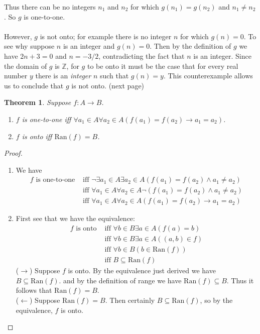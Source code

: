\documentclass{report}
\newtheorem*{theorem}{Theorem}
\theoremstyle{definition}
\begin{document}
Thus there can be no integers $n_1$ and $n_2$ for which $g(n_1)=g(n_2)$ and $n_1\neq n_2$. So $g$ is one-to-one.\\
\vspace{1mm}\\
However, $g$ is not onto; for example there is no integer $n$ for which $g(n)=0$. To
see why suppose $n$ is an integer and $g(n)=0$. Then by the definition of $g$ we have $2n+3=0$ and $n=-3/2$, contradicting the fact that $n$ is an integer. Since the domain of $g$ is $\mathbb Z$, 
for $g$ to be onto it must be the case that for every real number $y$ there is an \textit{integer} $n$ such that $g(n)=y$. This counterexample allows us to conclude that $g$ is not onto.
(next page)\newpage
\begin{theorem}
Suppose $f:A\to B$.
\begin{enumerate}
\item $f$ is one-to-one iff $\forall a_1\in A\forall a_2\in A(f(a_1)=f(a_2)\to a_1=a_2)$.
\item $f$ is onto iff $\text{Ran}(f)=B$.
\end{enumerate}
\end{theorem}
\begin{proof}\hspace{1mm}
\begin{enumerate}
\item We have
\begin{align*}
f\text{ is one-to-one}&\text{ iff }\neg\exists a_1\in A\exists a_2\in A(f(a_1)=f(a_2)\land a_1\neq a_2)\\
&\text{ iff }\forall a_1\in A\forall a_2\in A\neg(f(a_1)=f(a_2)\land a_1\neq a_2)\\
&\text{ iff }\forall a_1\in A\forall a_2\in A(f(a_1)=f(a_2)\to a_1=a_2)
\end{align*}
\item First see that we have the equivalence:
\begin{align*}
f\text{ is onto}&\text{ iff }\forall b\in B\exists a\in A(f(a)=b)\\
&\text{ iff }\forall b\in B\exists a\in A((a,b)\in f)\\
&\text{ iff }\forall b\in B (b\in\text{Ran}(f))\\
&\text{ iff }B\subseteq\text{Ran}(f)
\end{align*}
($\rightarrow$) Suppose $f$ is onto. By the equivalence just derived we have $B\subseteq\text{Ran}(f)$. and by the definition of range we have $\text{Ran}(f)\subseteq B$. Thus it follows
that $\text{Ran}(f)=B$.\\
($\leftarrow$) Suppose $\text{Ran}(f)=B$. Then certainly $B\subseteq\text{Ran}(f)$, so by the equivalence, $f$ is onto.\qedhere
\end{enumerate}
\end{proof}
\end{document}
